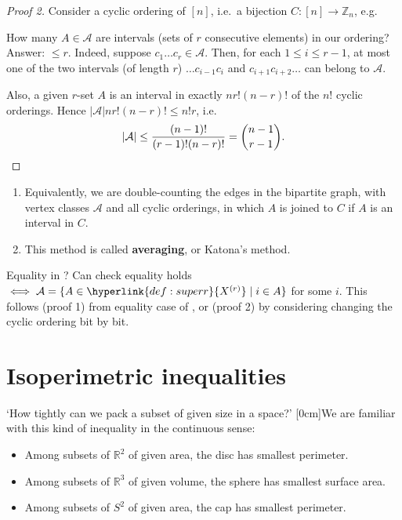 \documentclass{article}
\newcommand{\A}{\mathcal{A}}
\newcommand{\named}[1]{\textbf{#1}\index{#1}}
\begin{document}
\begin{proof}[Proof 2]
  Consider a cyclic ordering of $[n]$, i.e.\ a bijection $C: [n] \to \mathbb{Z}_n$, e.g.
  \begin{center}
  \end{center}
  How many $A \in \A$ are intervals (sets of $r$ consecutive elements) in our ordering?
  Answer: $\leq r$. Indeed, suppose $c_1 \dots c_r \in \mathcal{A}$.
  Then, for each $1 \leq i \leq r-1$, at most one of the two intervals (of length $r$) $\dots c_{i-1} c_i$ and $c_{i+1} c_{i+2} \dots$ can belong to $\A$.

  Also, a given $r$-set $A$ is an interval in exactly $n r! (n-r)!$ of the $n!$ cyclic orderings.
  Hence $|\A| n r! (n-r)! \leq n! r$, i.e.
  \begin{equation*}
    |\A| \leq \frac{(n-1)!}{(r-1)! (n-r)!} = \binom{n-1}{r-1}. \qedhere
  \end{equation*}
\end{proof}
\begin{remark}\leavevmode
  \begin{enumerate}
    \item Equivalently, we are double-counting the edges in the bipartite graph, with vertex classes $\A$ and all cyclic orderings, in which $A$ is joined to $C$ if $A$ is an interval in $C$.
    \item This method is called \named{averaging}, or Katona's method.
  \end{enumerate}
\end{remark}
Equality in ?
Can check equality holds $\iff \A = \{A \in \hyperlink{def:superr}{X^{(r)}} \mid i \in A\}$ for some $i$.
This follows (proof 1) from equality case of , or (proof 2) by considering changing the cyclic ordering bit by bit.
\clearpage
\section{Isoperimetric inequalities}
`How tightly can we pack a subset of given size in a space?'
[0cm]We are familiar with this kind of inequality in the continuous sense:
\begin{itemize}
  \item Among subsets of $\mathbb{R}^2$ of given area, the disc has smallest perimeter.
  \item Among subsets of $\mathbb{R}^3$ of given volume, the sphere has smallest surface area.
  \item Among subsets of $S^2$ of given area, the cap has smallest perimeter.
\end{itemize}
\end{document}
